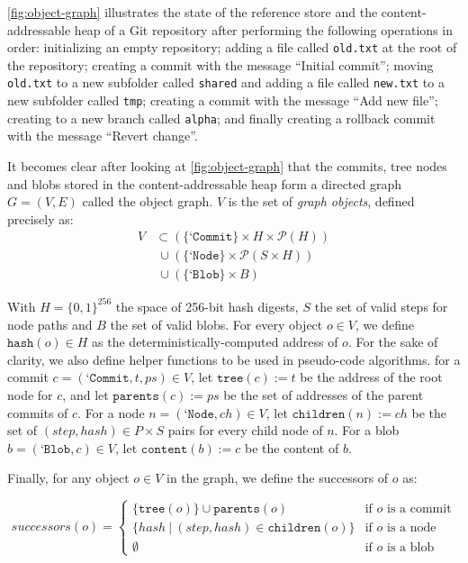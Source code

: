 

\bigskip
\cref{fig:object-graph} illustrates the state of the reference store and the content-addressable heap of a Git repository after performing the following operations in order: initializing an empty repository; adding a file called \texttt{old.txt} at the root of the repository; creating a commit with the message ``Initial commit''; moving \texttt{old.txt} to a new subfolder called \texttt{shared} and adding a file called \texttt{new.txt} to a new subfolder called \texttt{tmp}; creating a commit with the message ``Add new file''; creating to a new branch called \texttt{alpha}; and finally creating a rollback commit with the message ``Revert change''.

\bigskip
It becomes clear after looking at \cref{fig:object-graph} that the commits, tree nodes and blobs stored in the content-addressable heap form a directed graph \(G = (V, E)\) called the object graph. \(V\) is the set of \emph{graph objects}, defined precisely as:
\begin{align*}
  V & \subset (\{\texttt{`Commit}\} \times H \times \mathcal{P}(H)) \\
    & \ \cup  (\{\texttt{`Node}\} \times \mathcal{P}(S \times H))   \\
    & \ \cup  (\{\texttt{`Blob}\} \times B)
\end{align*}

With \(H = \{0, 1\}^{256}\) the space of 256-bit hash digests, \(S\) the set of valid steps for node paths and \(B\) the set of valid blobs. For every object \(o \in V\), we define \(\texttt{hash}(o) \in H\) as the deterministically-computed address of \(o\). For the sake of clarity, we also define helper functions to be used in pseudo-code algorithms. for a commit \(c = (\texttt{`Commit}, t, ps) \in V\), let \(\texttt{tree}(c) := t\) be the address of the root node for \(c\), and let \(\texttt{parents}(c) := ps\) be the set of addresses of the parent commits of \(c\). For a node \(n = (\texttt{`Node}, ch) \in V\), let \(\texttt{children}(n) := ch\) be the set of \((step, hash) \in P \times S\) pairs for every child node of \(n\). For a blob \(b = (\texttt{`Blob}, c) \in V\), let \(\texttt{content}(b) := c\) be the content of \(b\).

Finally, for any object \(o \in V\) in the graph, we define the successors of \(o\) as:

\begin{equation*}
  successors(o) =
  \begin{cases}
    \{\texttt{tree}(o)\} \cup \texttt{parents}(o)         & \text{if $o$ is a commit}
    \\
    \{hash \ | \ (step, hash) \in \texttt{children}(o) \} & \text{if $o$ is a node}
    \\
    \emptyset                                             & \text{if $o$ is a blob}
  \end{cases}
\end{equation*}

